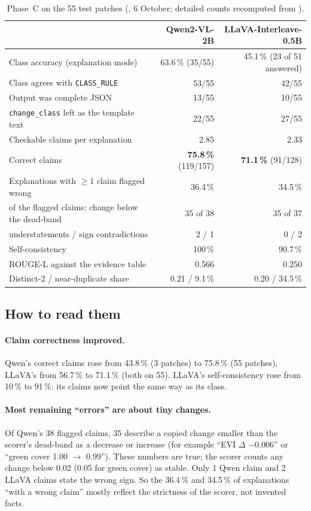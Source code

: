 \begin{table}[H]
\centering
\caption{Phase~C on the 55 test patches (, 6 October; detailed counts recomputed from ).}
\label{tab:phaseC}
\small
\begin{tabular}{lrr}
\toprule
 & Qwen2-VL-2B & LLaVA-Interleave-0.5B \\
\midrule
Class accuracy (explanation mode) & 63.6\,\% (35/55) & 45.1\,\% (23 of 51 answered) \\
Class agrees with \texttt{CLASS\_RULE} & 53/55 & 42/55 \\
Output was complete JSON & 13/55 & 10/55 \\
\texttt{change\_class} left as the template text & 22/55 & 27/55 \\
Checkable claims per explanation & 2.85 & 2.33 \\
Correct claims & \textbf{75.8\,\%} (119/157) & \textbf{71.1\,\%} (91/128) \\
Explanations with $\ge 1$ claim flagged wrong & 36.4\,\% & 34.5\,\% \\
\quad of the flagged claims: change below the dead-band & 35 of 38 & 35 of 37 \\
\quad understatements / sign contradictions & 2 / 1 & 0 / 2 \\
Self-consistency & 100\,\% & 90.7\,\% \\
ROUGE-L against the evidence table & 0.566 & 0.250 \\
Distinct-2 / near-duplicate share & 0.21 / 9.1\,\% & 0.20 / 34.5\,\% \\
\bottomrule
\end{tabular}
\end{table}

\subsection{How to read them}

\paragraph{Claim correctness improved.} Qwen's correct claims rose from 43.8\,\% (3 patches) to 75.8\,\% (55 patches), LLaVA's from 56.7\,\% to 71.1\,\% (both on 55). LLaVA's self-consistency rose from 10\,\% to 91\,\%: its claims now point the same way as its class.

\paragraph{Most remaining ``errors'' are about tiny changes.} Of Qwen's 38 flagged claims, 35 describe a copied change smaller than the scorer's dead-band as a decrease or increase (for example ``EVI $\Delta$ $-0.006$'' or ``green cover 1.00 $\rightarrow$ 0.99''). These numbers are true; the scorer counts any change below 0.02 (0.05 for green cover) as stable. Only 1 Qwen claim and 2 LLaVA claims state the wrong sign. So the 36.4\,\% and 34.5\,\% of explanations ``with a wrong claim'' mostly reflect the strictness of the scorer, not invented facts.

